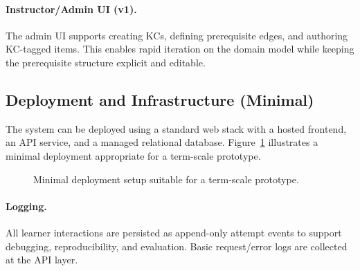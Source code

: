 \documentclass{article}
\begin{document}
\paragraph{Instructor/Admin UI (v1).}
The admin UI supports creating KCs, defining prerequisite edges, and authoring KC-tagged items. This enables
rapid iteration on the domain model while keeping the prerequisite structure explicit and editable.

\FloatBarrier

\subsection{Deployment and Infrastructure (Minimal)}
The system can be deployed using a standard web stack with a hosted frontend, an API service, and a managed
relational database. Figure~\ref{fig:infra} illustrates a minimal deployment appropriate for a term-scale prototype.

\begin{figure}[H]
\centering
{}
\caption{Minimal deployment setup suitable for a term-scale prototype.}
\label{fig:infra}
\end{figure}

\paragraph{Logging.}
All learner interactions are persisted as append-only attempt events to support debugging, reproducibility, and
evaluation. Basic request/error logs are collected at the API layer.
\end{document}
